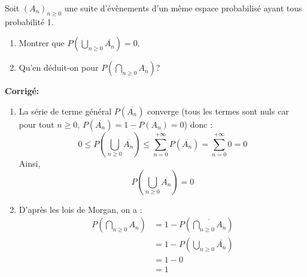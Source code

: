 \documentclass[a4paper,twoside,french,10pt]{VcCours}
\newcommand{\corr}{\textbf{Corrigé:}}
\begin{document}
\begin{Exercice}{} Soit $(A_n)_{n \geq 0}$ une suite d'évènements d'un même espace probabilisé ayant tous probabilité 1. 
 
 \begin{enumerate}
 \item Montrer que $P \left( \bigcup_{n \geq 0} \overline{A_n} \right) = 0$.
 \item Qu'en déduit-on pour $P \left( \bigcap_{n \geq 0} A_n \right)$?
 \end{enumerate}
 \end{Exercice}
 
 \corr 
 
 \begin{enumerate}
 \item La série de terme général $P( \overline{A_n})$ converge (tous les termes sont nuls car pour tout $n \geq 0$, $P( \overline{A_n})= 1- P(A_n)=0$) donc :
 $$ 0 \leq P \left( \bigcup_{n \geq 0} \overline{A_n} \right) \leq \sum_{n=0}^{+ \infty} P( \overline{A_n})  = \sum_{n=0}^{+ \infty} 0 = 0$$
 Ainsi,
 $$ P \left( \bigcup_{n \geq 0} \overline{A_n} \right)=0$$
 \item D'après les lois de Morgan, on a :
 \begin{align*}
 P \left( \bigcap_{n \geq 0} A_n \right) & = 1 - P \left( \overline{\bigcap_{n \geq 0} A_n} \right) \\
 &= 1 - P \left( \bigcup_{n \geq 0} \overline{A_n} \right) \\
 & =1-0 \\
 & = 1
 \end{align*}
 \end{enumerate}
\end{document}
